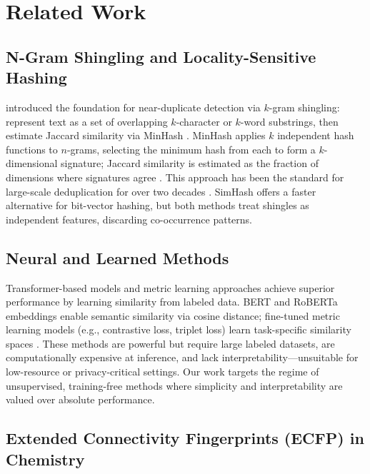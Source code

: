 \documentclass[11pt,letterpaper]{article}
\begin{document}
\section{Related Work}

\subsection{N-Gram Shingling and Locality-Sensitive Hashing}

\citet{Broder1997} introduced the foundation for near-duplicate detection via $k$-gram shingling: represent text as a set of overlapping $k$-character or $k$-word substrings, then estimate Jaccard similarity via MinHash \citep{Broder2000}. MinHash applies $k$ independent hash functions to $n$-grams, selecting the minimum hash from each to form a $k$-dimensional signature; Jaccard similarity is estimated as the fraction of dimensions where signatures agree \citep{Broder2000}. This approach has been the standard for large-scale deduplication for over two decades \citep{Broder1997, Broder2000}. SimHash \citep{Charikar2002} offers a faster alternative for bit-vector hashing, but both methods treat shingles as independent features, discarding co-occurrence patterns.

\subsection{Neural and Learned Methods}

Transformer-based models and metric learning approaches achieve superior performance by learning similarity from labeled data. BERT and RoBERTa embeddings \citep{Devlin2019} enable semantic similarity via cosine distance; fine-tuned metric learning models (e.g., contrastive loss, triplet loss) learn task-specific similarity spaces \citep{Hu2019}. These methods are powerful but require large labeled datasets, are computationally expensive at inference, and lack interpretability---unsuitable for low-resource or privacy-critical settings. Our work targets the regime of unsupervised, training-free methods where simplicity and interpretability are valued over absolute performance.

\subsection{Extended Connectivity Fingerprints (ECFP) in Chemistry}
\end{document}
